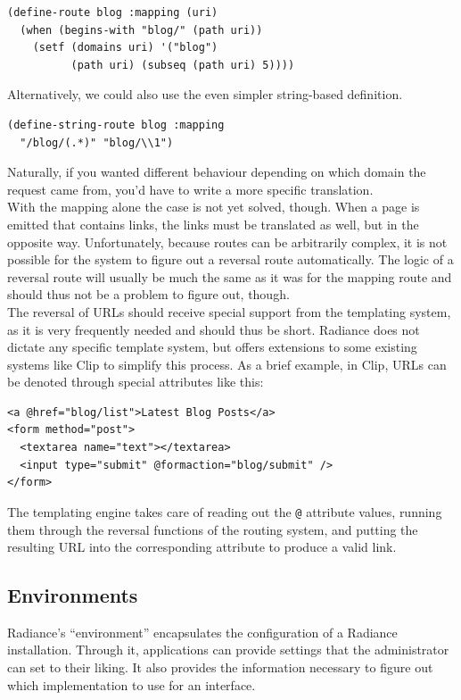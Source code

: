 \documentclass{sig-alternate}
\begin{document}
\begin{verbatim}
(define-route blog :mapping (uri)
  (when (begins-with "blog/" (path uri))
    (setf (domains uri) '("blog")
          (path uri) (subseq (path uri) 5))))
\end{verbatim}

Alternatively, we could also use the even simpler string-based definition.

\begin{verbatim}
(define-string-route blog :mapping
  "/blog/(.*)" "blog/\\1")
\end{verbatim}

Naturally, if you wanted different behaviour depending on which domain the request came from, you'd have to write a more specific translation. \\

With the mapping alone the case is not yet solved, though. When a page is emitted that contains links, the links must be translated as well, but in the opposite way. Unfortunately, because routes can be arbitrarily complex, it is not possible for the system to figure out a reversal route automatically. The logic of a reversal route will usually be much the same as it was for the mapping route and should thus not be a problem to figure out, though. \\

The reversal of URLs should receive special support from the templating system, as it is very frequently needed and should thus be short. Radiance does not dictate any specific template system, but offers extensions to some existing systems like Clip\cite{clip} to simplify this process. As a brief example, in Clip, URLs can be denoted through special attributes like this:

\begin{verbatim}
<a @href="blog/list">Latest Blog Posts</a>
<form method="post">
  <textarea name="text"></textarea>
  <input type="submit" @formaction="blog/submit" />
</form>
\end{verbatim}

The templating engine takes care of reading out the \texttt{@} attribute values, running them through the reversal functions of the routing system, and putting the resulting URL into the corresponding attribute to produce a valid link.

\subsection{Environments}
Radiance's ``environment'' encapsulates the configuration of a Radiance installation. Through it, applications can provide settings that the administrator can set to their liking. It also provides the information necessary to figure out which implementation to use for an interface. \\
\end{document}
